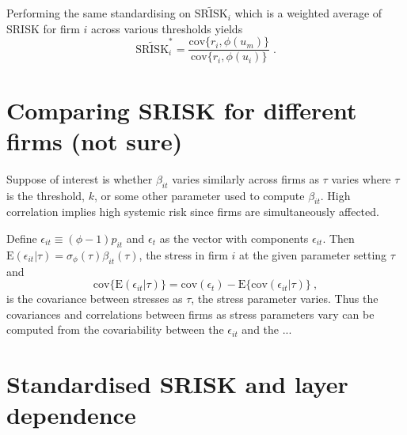 \documentclass[authoryear]{elsarticle}
\newcommand{\E}{\mathrm{E}}
\newcommand{\e}{\mathrm{e}}
\newcommand{\cov}{\mathrm{cov}}
\newcommand{\eps}{\epsilon}
\newcommand{\Ex}{{\cal E}}
\begin{document}
Performing the same standardising on $\widetilde{\mathrm{SRISK}}_i$ which is a weighted average of SRISK for firm $i$ across various thresholds yields
$$
\widetilde{\mathrm{SRISK}}_i^* = \frac{\cov\{r_i,\phi(u_m)\}}{\cov\{r_i,\phi(u_i)\}}   \;.
$$





\section{Comparing SRISK for different firms (not sure)}

Suppose of interest is whether $\beta_{it}$ varies similarly  across firms as $\tau$ varies where $\tau$ is the threshold, $k$, or some other parameter used to compute $\beta_{it}$. High correlation implies high systemic risk since firms are simultaneously affected.

Define $\eps_{it}\equiv(\phi-1)p_{it}$ and $\eps_t$ as the vector with components $\eps_{it}$.  Then $\E(\eps_{it}|\tau)=\sigma_\phi(\tau)\beta_{it}(\tau)$, the stress in firm $i$ at the given parameter setting $\tau$  and
$$
\cov\{\E(\eps_{it}|\tau)\}=\cov(\eps_{t})-\E\{\cov(\eps_{it}|\tau)\}\ ,
$$
is the covariance between stresses as $\tau$, the stress parameter varies.   Thus the covariances and correlations between firms as stress parameters vary can be computed from the covariability between the $\eps_{it}$ and the ...

\section{Standardised SRISK and layer dependence}
\end{document}
